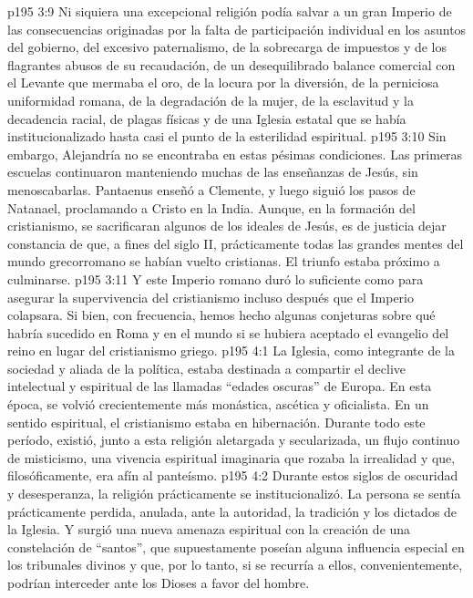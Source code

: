 \vs p195 3:9 Ni siquiera una excepcional religión podía salvar a un gran Imperio de las consecuencias originadas por la falta de participación individual en los asuntos del gobierno, del excesivo paternalismo, de la sobrecarga de impuestos y de los flagrantes abusos de su recaudación, de un desequilibrado balance comercial con el Levante que mermaba el oro, de la locura por la diversión, de la perniciosa uniformidad romana, de la degradación de la mujer, de la esclavitud y la decadencia racial, de plagas físicas y de una Iglesia estatal que se había institucionalizado hasta casi el punto de la esterilidad espiritual.
\vs p195 3:10 Sin embargo, Alejandría no se encontraba en estas pésimas condiciones. Las primeras escuelas continuaron manteniendo muchas de las enseñanzas de Jesús, sin menoscabarlas. Pantaenus enseñó a Clemente, y luego siguió los pasos de Natanael, proclamando a Cristo en la India. Aunque, en la formación del cristianismo, se sacrificaran algunos de los ideales de Jesús, es de justicia dejar constancia de que, a fines del siglo II, prácticamente todas las grandes mentes del mundo grecorromano se habían vuelto cristianas. El triunfo estaba próximo a culminarse.
\vs p195 3:11 Y este Imperio romano duró lo suficiente como para asegurar la supervivencia del cristianismo incluso después que el Imperio colapsara. Si bien, con frecuencia, hemos hecho algunas conjeturas sobre qué habría sucedido en Roma y en el mundo si se hubiera aceptado el evangelio del reino en lugar del cristianismo griego.
\vs p195 4:1 La Iglesia, como integrante de la sociedad y aliada de la política, estaba destinada a compartir el declive intelectual y espiritual de las llamadas “edades oscuras” de Europa. En esta época, se volvió crecientemente más monástica, ascética y oficialista. En un sentido espiritual, el cristianismo estaba en hibernación. Durante todo este período, existió, junto a esta religión aletargada y secularizada, un flujo continuo de misticismo, una vivencia espiritual imaginaria que rozaba la irrealidad y que, filosóficamente, era afín al panteísmo.
\vs p195 4:2 Durante estos siglos de oscuridad y desesperanza, la religión prácticamente se institucionalizó. La persona se sentía prácticamente perdida, anulada, ante la autoridad, la tradición y los dictados de la Iglesia. Y surgió una nueva amenaza espiritual con la creación de una constelación de “santos”, que supuestamente poseían alguna influencia especial en los tribunales divinos y que, por lo tanto, si se recurría a ellos, convenientemente, podrían interceder ante los Dioses a favor del hombre.

